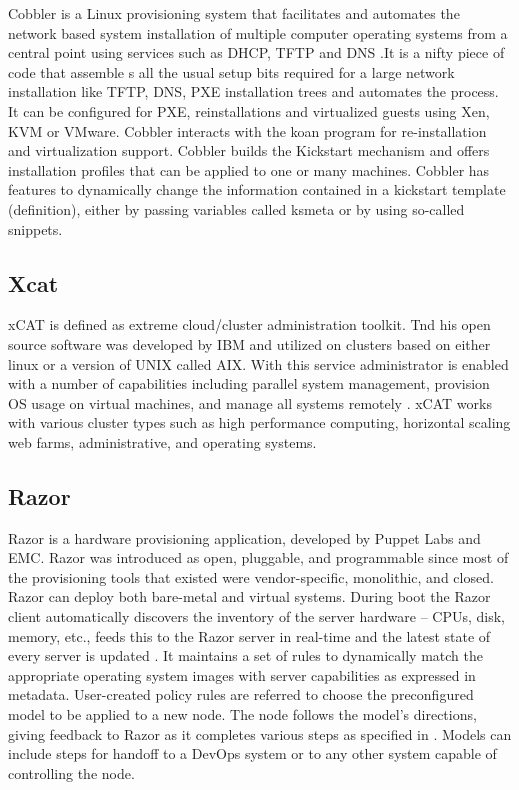 {     Cobbler is a Linux provisioning system that facilitates and
     automates the network based system installation of multiple computer
     operating systems from a central point using services such as DHCP,
     TFTP and DNS \cite{www-cobbler}.It is a nifty piece of code that
     assemble s all the usual
     setup bits required for a large network installation like TFTP, DNS,
     PXE installation trees and automates the process. It can be
     configured for PXE, reinstallations and virtualized guests using Xen,
     KVM or VMware.  Cobbler interacts with the koan program for
     re-installation and virtualization support.  Cobbler builds the
     Kickstart mechanism and offers installation profiles that can be
     applied to one or many machines.  Cobbler has features to dynamically
     change the information contained in a kickstart template (definition),
     either by passing variables called ksmeta or by using so-called
     snippets.

\subsection{Xcat}

     xCAT is defined as extreme cloud/cluster administration
     toolkit. Tnd his open source software was developed by IBM and 
     utilized on clusters based on either linux or a version of UNIX 
     called AIX. With this service administrator is enabled with 
     a number of capabilities including parallel system management, 
     provision OS usage on virtual machines, and manage all systems 
     remotely \cite{www-xcat}. xCAT works with various cluster types
     such as high performance computing, horizontal scaling web farms, 
     administrative, and operating systems. \cite{www-03ibm}

     \pv
     
\subsection{Razor}

     Razor is a hardware provisioning application, developed by Puppet
     Labs and EMC. Razor was introduced as open, pluggable, and
     programmable since most of the provisioning tools that existed
     were vendor-specific, monolithic, and closed. Razor can deploy
     both bare-metal and virtual
     systems. During boot the Razor client automatically discovers the
     inventory of the server hardware – CPUs, disk, memory, etc.,
     feeds this to the Razor server in real-time and the latest state
     of every server is updated \cite{www-RazorWiki}. It maintains a set of rules to
     dynamically match the appropriate operating system images with
     server capabilities as expressed in metadata. User-created policy
     rules are referred to choose the preconfigured model to be
     applied to a new node. The node follows the model's directions,
     giving feedback to Razor as it completes various steps as
     specified in \cite{www-RazorPuppet}. Models can include steps
     for handoff to a DevOps system or to any other system capable of
     controlling the node.

}

